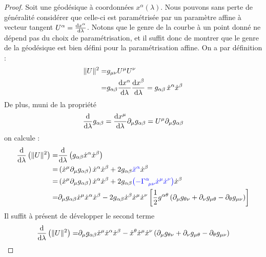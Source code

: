 \begin{proof}
    Soit une géodésique à coordonnées $x^{\alpha}(\lambda)$. Nous pouvons sans perte de généralité considérer que celle-ci est paramétrisée par un paramètre affine à vecteur tangent  $U^{\alpha} = \frac{\mathrm{d} x^{\alpha}}{\mathrm{d}\lambda}$. Notons que le genre de la courbe à un point donné ne dépend pas du choix de paramétrisation, et il suffit donc de montrer que le genre de la géodésique est bien défini pour la paramétrisation affine. On a par définition :
    \begin{align}
        \Vert  U \Vert ^2 =& g_{\mu \nu}U^{\mu}U^{\nu}\\
        =& g_{\alpha \beta}\frac{\mathrm{d} x^{\alpha}}{\mathrm{d} \lambda}\frac{\mathrm{d} x^{\beta}}{\mathrm{d} \lambda} = g_{\alpha\beta}\, \dot{x}^\alpha \dot{x}^\beta
    \end{align}
    De plus, muni de la propriété 
    \begin{equation*}
    \frac{\mathrm{d}}{\mathrm{d} \lambda} g_{\alpha\beta} = \frac{\mathrm{d} x^\mu}{\mathrm{d} \lambda} \partial_\mu g_{\alpha\beta} = U^\mu \partial_\mu g_{\alpha\beta}
    \end{equation*}
    on calcule :
    \begin{align}
        \frac{\td }{\td \lambda}\left(\Vert  U \Vert ^2\right)
        =&\frac{\td }{\td \lambda}\left(g_{\alpha \beta}\dot{x}^{\alpha}\dot{x}^{\beta} \right)\\
        =&\left(\dot{x}^{\mu}\partial_{\mu}g_{\alpha \beta}\right)\dot{x}^{\alpha}\dot{x}^{\beta}  + 2g_{\alpha \beta}\textcolor{blue}{\ddot{x}^{\alpha}}\dot{x}^{\beta}\\
        =&\left(\dot{x}^{\mu}\partial_{\mu}g_{\alpha \beta}\right)\dot{x}^{\alpha}\dot{x}^{\beta} + 2g_{\alpha \beta}\textcolor{blue}{\left(-\Gamma\indices{^{\alpha}_{\!\mu \nu}}\dot{x}^{\mu}\dot{x}^{\nu}\right)} \dot{x}^{\beta}\\
        =&\partial_{\mu}g_{\alpha \beta}\dot{x}^{\mu}\dot{x}^{\alpha}\dot{x}^{\beta} - 2g_{\alpha \beta}\dot{x}^{\beta}\dot{x}^{\mu}\dot{x}^{\nu}\left[\frac{1}{2}g^{\alpha \theta}\left(\partial_{\mu}g_{\theta\nu} + \partial_{\nu}g_{\mu \theta}-\partial_{\theta}g_{\mu \nu}\right)\right]
    \end{align}
    Il suffit à présent de développer le second terme 
    \begin{align}
        \frac{\td }{\td \lambda}\left(\Vert  U \Vert ^2\right)
        =&\partial_{\mu}g_{\alpha \beta}\dot{x}^{\mu}\dot{x}^{\alpha}\dot{x}^{\beta} - \dot{x}^{\theta}\dot{x}^{\mu}\dot{x}^{\nu}\left(\partial_{\mu}g_{\theta\nu} + \partial_{\nu}g_{\mu \theta}-\partial_{\theta}g_{\mu \nu}\right)\\

\end{align}
\end{proof}
